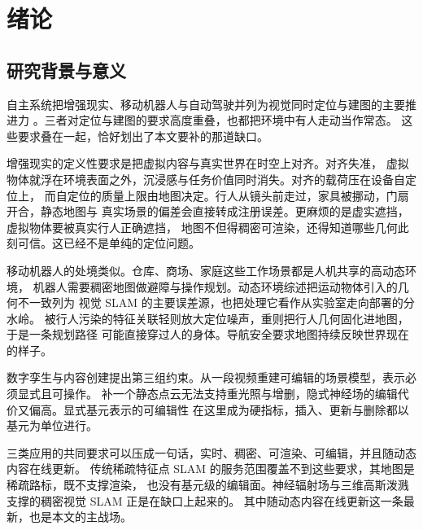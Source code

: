 %

\chapter{绪论}
\label{ch:intro}

\section{研究背景与意义}

自主系统把增强现实、移动机器人与自动驾驶并列为视觉同时定位与建图的主要推进力
\cite{wang2024dynamicsurvey}。三者对定位与建图的要求高度重叠，也都把环境中有人走动当作常态。
这些要求叠在一起，恰好划出了本文要补的那道缺口。

增强现实的定义性要求是把虚拟内容与真实世界在时空上对齐\cite{azuma1997ar}。对齐失准，
虚拟物体就浮在环境表面之外，沉浸感与任务价值同时消失。对齐的载荷压在设备自定位上，
而自定位的质量上限由地图决定。行人从镜头前走过，家具被挪动，门扇开合，静态地图与
真实场景的偏差会直接转成注册误差。更麻烦的是虚实遮挡，虚拟物体要被真实行人正确遮挡，
地图不但得稠密可渲染，还得知道哪些几何此刻可信。这已经不是单纯的定位问题。

移动机器人的处境类似。仓库、商场、家庭这些工作场景都是人机共享的高动态环境，
机器人需要稠密地图做避障与操作规划。动态环境综述把运动物体引入的几何不一致列为
视觉 SLAM 的主要误差源，也把处理它看作从实验室走向部署的分水岭\cite{saputra2018survey}。
被行人污染的特征关联轻则放大定位噪声，重则把行人几何固化进地图，于是一条规划路径
可能直接穿过人的身体。导航安全要求地图持续反映世界现在的样子。

数字孪生与内容创建提出第三组约束。从一段视频重建可编辑的场景模型，表示必须显式且可操作。
补一个静态点云无法支持重光照与增删，隐式神经场的编辑代价又偏高。显式基元表示的可编辑性
在这里成为硬指标，插入、更新与删除都以基元为单位进行。

三类应用的共同要求可以压成一句话，实时、稠密、可渲染、可编辑，并且随动态内容在线更新。
传统稀疏特征点 SLAM 的服务范围覆盖不到这些要求，其地图是稀疏路标，既不支撑渲染，
也没有基元级的编辑面。神经辐射场与三维高斯泼溅支撑的稠密视觉 SLAM 正是在缺口上起来的。
其中随动态内容在线更新这一条最新，也是本文的主战场。


